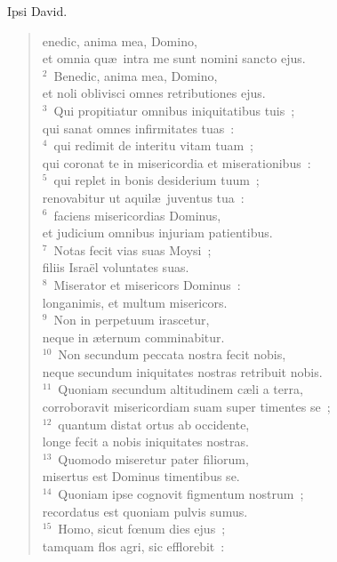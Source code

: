 \bchapter[Psalm]
Ipsi David. \begin{verse}enedic, anima mea, Domino,\\ et omnia qu\ae\ intra me sunt nomini sancto ejus.\\
${}^{2}$~Benedic, anima mea, Domino,\\ et noli oblivisci omnes retributiones ejus.\\
${}^{3}$~Qui propitiatur omnibus iniquitatibus tuis~;\\ qui sanat omnes infirmitates tuas~:\\
${}^{4}$~qui redimit de interitu vitam tuam~;\\ qui coronat te in misericordia et miserationibus~:\\
${}^{5}$~qui replet in bonis desiderium tuum~;\\ renovabitur ut aquil\ae\ juventus tua~:\\
${}^{6}$~faciens misericordias Dominus,\\ et judicium omnibus injuriam patientibus.\\
${}^{7}$~Notas fecit vias suas Moysi~;\\ filiis Isra\"el voluntates suas.\\
${}^{8}$~Miserator et misericors Dominus~:\\ longanimis, et multum misericors.\\
${}^{9}$~Non in perpetuum irascetur,\\ neque in \ae ternum comminabitur.\\
${}^{10}$~Non secundum peccata nostra fecit nobis,\\ neque secundum iniquitates nostras retribuit nobis.\\
${}^{11}$~Quoniam secundum altitudinem c\ae li a terra,\\ corroboravit misericordiam suam super timentes se~;\\
${}^{12}$~quantum distat ortus ab occidente,\\ longe fecit a nobis iniquitates nostras.\\
${}^{13}$~Quomodo miseretur pater filiorum,\\ misertus est Dominus timentibus se.\\
${}^{14}$~Quoniam ipse cognovit figmentum nostrum~;\\ recordatus est quoniam pulvis sumus.\\
${}^{15}$~Homo, sicut fœnum dies ejus~;\\ tamquam flos agri, sic efflorebit~:\\

\end{verse}

